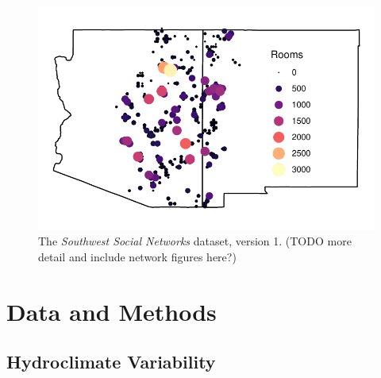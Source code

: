 \documentclass[11pt]{iopart}
\begin{document}

\begin{figure}[!htbp]
\centering
\includegraphics[width=.9\linewidth]{figures/site_distribution.pdf}
\caption{The \emph{Southwest Social Networks} dataset, version 1. (TODO more detail and include network figures here?)} 
\label{fig:network-plot}
\end{figure}

\section*{Data and Methods}

\subsection*{Hydroclimate Variability}
\end{document}

